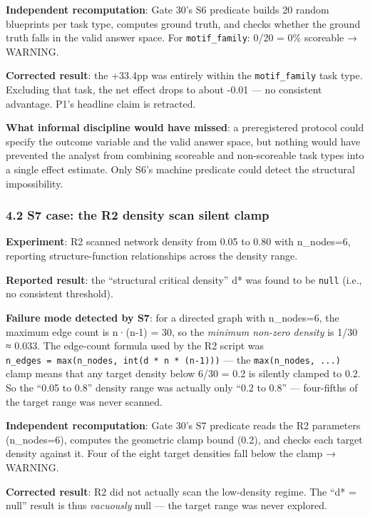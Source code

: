 \documentclass[
]{article}
\begin{document}
\textbf{Independent recomputation}: Gate 30's S6 predicate builds 20
random blueprints per task type, computes ground truth, and checks
whether the ground truth falls in the valid answer space. For
\texttt{motif\_family}: 0/20 = 0\% scoreable → WARNING.

\textbf{Corrected result}: the +33.4pp was entirely within the
\texttt{motif\_family} task type. Excluding that task, the net effect
drops to about -0.01 --- no consistent advantage. P1's headline claim is
retracted.

\textbf{What informal discipline would have missed}: a preregistered
protocol could specify the outcome variable and the valid answer space,
but nothing would have prevented the analyst from combining scoreable
and non-scoreable task types into a single effect estimate. Only S6's
machine predicate could detect the structural impossibility.

\subsubsection{4.2 S7 case: the R2 density scan silent
clamp}\label{s7-case-the-r2-density-scan-silent-clamp}

\textbf{Experiment}: R2 scanned network density from 0.05 to 0.80 with
n\_nodes=6, reporting structure-function relationships across the
density range.

\textbf{Reported result}: the ``structural critical density'' d* was
found to be \texttt{null} (i.e., no consistent threshold).

\textbf{Failure mode detected by S7}: for a directed graph with
n\_nodes=6, the maximum edge count is n·(n-1) = 30, so the \emph{minimum
non-zero density} is 1/30 ≈ 0.033. The edge-count formula used by the R2
script was \texttt{n\_edges\ =\ max(n\_nodes,\ int(d\ *\ n\ *\ (n-1)))}
--- the \texttt{max(n\_nodes,\ ...)} clamp means that any target density
below 6/30 = 0.2 is silently clamped to 0.2. So the ``0.05 to 0.8''
density range was actually only ``0.2 to 0.8'' --- four-fifths of the
target range was never scanned.

\textbf{Independent recomputation}: Gate 30's S7 predicate reads the R2
parameters (n\_nodes=6), computes the geometric clamp bound (0.2), and
checks each target density against it. Four of the eight target
densities fall below the clamp → WARNING.

\textbf{Corrected result}: R2 did not actually scan the low-density
regime. The ``d* = null'' result is thus \emph{vacuously} null --- the
target range was never explored.
\end{document}
